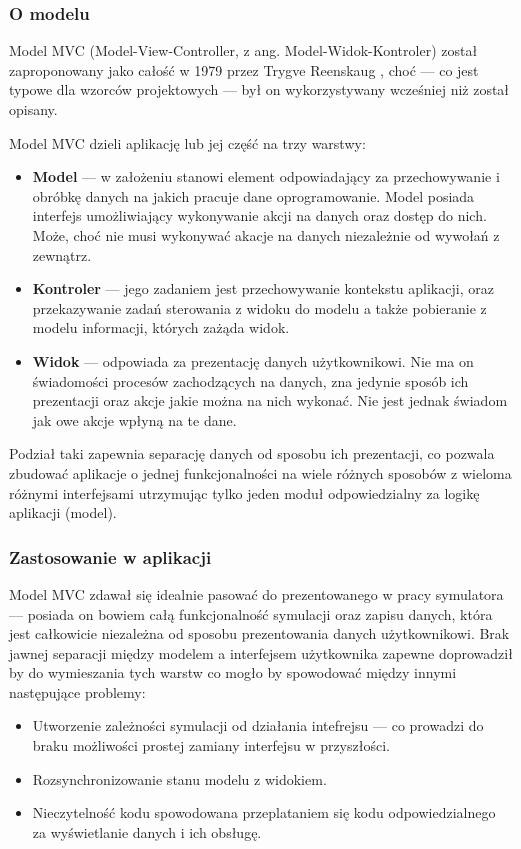 {\subsubsection{O modelu}
\par{
Model MVC (Model-View-Controller, z ang. Model-Widok-Kontroler) został zaproponowany jako całość w 1979 przez Trygve Reenskaug \cite{MVC}, choć --- co jest typowe dla wzorców projektowych --- był on wykorzystywany wcześniej niż został opisany. 
}
\par{
Model MVC dzieli aplikację lub jej część na trzy warstwy:
\begin{itemize}
\item \textbf{Model} --- w założeniu stanowi element odpowiadający za przechowywanie i obróbkę danych na jakich pracuje dane oprogramowanie. Model posiada interfejs umożliwiający wykonywanie akcji na danych oraz dostęp do nich. Może, choć nie musi wykonywać akacje na danych niezależnie od wywołań z zewnątrz.
\item \textbf{Kontroler} --- jego zadaniem jest przechowywanie kontekstu aplikacji, oraz przekazywanie zadań sterowania z widoku do modelu a także pobieranie z modelu informacji, których zażąda widok.
\item \textbf{Widok} --- odpowiada za prezentację danych użytkownikowi. Nie ma on świadomości procesów zachodzących na danych, zna jedynie sposób ich prezentacji oraz akcje jakie można na nich wykonać. Nie jest jednak świadom jak owe akcje wpłyną na te dane.
\end{itemize}
}
\par{
Podział taki zapewnia separację danych od sposobu ich prezentacji, co pozwala zbudować aplikacje o jednej funkcjonalności na wiele różnych sposobów z wieloma różnymi interfejsami utrzymując tylko jeden moduł odpowiedzialny za logikę aplikacji (model).
}
\subsubsection{Zastosowanie w aplikacji}
\par{
Model MVC zdawał się idealnie pasować do prezentowanego w pracy symulatora --- posiada on bowiem całą funkcjonalność symulacji oraz zapisu danych, która jest całkowicie niezależna od sposobu prezentowania danych użytkownikowi. Brak jawnej separacji między modelem a interfejsem użytkownika zapewne doprowadził by do wymieszania tych warstw co mogło by spowodować między innymi następujące problemy:
\begin{itemize}
\renewcommand{\labelitemi}{$\bullet$}
\item Utworzenie zależności symulacji od działania intefrejsu --- co prowadzi do braku możliwości prostej zamiany interfejsu w przyszłości.
\item Rozsynchronizowanie stanu modelu z widokiem.
\item Nieczytelność kodu spowodowana przeplataniem się kodu odpowiedzialnego za wyświetlanie danych i ich obsługę.
\end{itemize}
}
}
